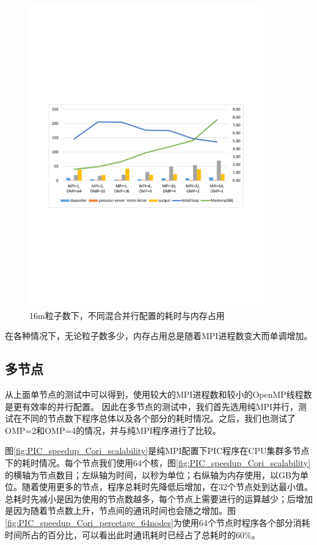 \begin{figure}[!htb]
  \centering
  \includegraphics[width=0.9\textwidth]{Img/PIC_speedup_Cori_1node_16m.pdf}
  \caption{16m粒子数下，不同混合并行配置的耗时与内存占用}
  \label{fig:PIC_speedup_Cori_1node_16m}
\end{figure}

在各种情况下，无论粒子数多少，内存占用总是随着MPI进程数变大而单调增加。
\subsection{多节点}
从上面单节点的测试中可以得到，使用较大的MPI进程数和较小的OpenMP线程数是更有效率的并行配置。
因此在多节点的测试中，我们首先选用纯MPI并行，测试在不同的节点数下程序总体以及各个部分的耗时情况。之后，我们也测试了OMP=2和OMP=4的情况，并与纯MPI程序进行了比较。

图\ref{fig:PIC_speedup_Cori_scalability}是纯MPI配置下PIC程序在CPU集群多节点下的耗时情况。每个节点我们使用64个核，图\ref{fig:PIC_speedup_Cori_scalability}的横轴为节点数目；左纵轴为时间，以秒为单位；右纵轴为内存使用，以GB为单位。随着使用更多的节点，程序总耗时先降低后增加，在32个节点处到达最小值。总耗时先减小是因为使用的节点数越多，每个节点上需要进行的运算越少；后增加是因为随着节点数上升，节点间的通讯时间也会随之增加。图\ref{fig:PIC_speedup_Cori_percetage_64nodes}为使用64个节点时程序各个部分消耗时间所占的百分比，可以看出此时通讯耗时已经占了总耗时的60\%。

